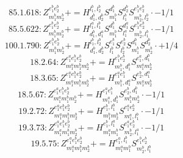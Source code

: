 \documentclass[letterpaper,10pt,fleqn,leqno,onecolumn]{article}
\begin{document}
\begin{equation} \;\;\;\;\;\;  85.1.618: Z^{e_{1}^{b}e_{2}^{b}}_{m_{1}^{b}m_{2}^{b}}+=H^{l_{1}^{b},l_{2}^{b}}_{d_{1}^{b},d_{2}^{b}}S^{d_{1}^{b}}_{m_{1}^{b}}S^{d_{2}^{b}}_{l_{1}^{b}}S^{e_{1}^{b}e_{2}^{b}}_{m_{2}^{b},l_{2}^{b}}\cdot -1/1 \end{equation}
\begin{equation} \;\;\;\;\;\;  85.5.622: Z^{e_{1}^{b}e_{2}^{b}}_{m_{1}^{b}m_{2}^{b}}+=H^{l_{1}^{a},l_{1}^{b}}_{d_{1}^{b},d_{1}^{a}}S^{d_{1}^{b}}_{m_{1}^{b}}S^{d_{1}^{a}}_{l_{1}^{a}}S^{e_{1}^{b}e_{2}^{b}}_{m_{2}^{b},l_{1}^{b}}\cdot -1/1 \end{equation}
\begin{equation} \;\;\;\;\;\;  100.1.790: Z^{e_{1}^{b}e_{2}^{b}}_{m_{1}^{b}m_{2}^{b}}+=H^{l_{1}^{b},l_{2}^{b}}_{d_{1}^{b},d_{2}^{b}}S^{e_{1}^{b}}_{l_{1}^{b}}S^{e_{2}^{b}}_{l_{2}^{b}}S^{d_{1}^{b}}_{m_{1}^{b}}S^{d_{2}^{b}}_{m_{2}^{b}}\cdot +1/4 \end{equation}
\begin{equation} \;\;\;\;\;\;  18.2.64: Z^{e_{1}^{a}e_{1}^{b}e_{2}^{b}}_{m_{1}^{a}m_{1}^{b}m_{2}^{b}}+=H^{e_{1}^{b}e_{2}^{b}}_{m_{1}^{b},d_{1}^{b}}S^{e_{1}^{a},d_{1}^{b}}_{m_{1}^{a}m_{2}^{b}} \end{equation}
\begin{equation} \;\;\;\;\;\;  18.3.65: Z^{e_{1}^{a}e_{1}^{b}e_{2}^{b}}_{m_{1}^{a}m_{1}^{b}m_{2}^{b}}+=H^{e_{1}^{a}e_{1}^{b}}_{m_{1}^{b},d_{1}^{a}}S^{e_{2}^{b},d_{1}^{a}}_{m_{1}^{a}m_{2}^{b}} \end{equation}
\begin{equation} \;\;\;\;\;\;  18.5.67: Z^{e_{1}^{a}e_{1}^{b}e_{2}^{b}}_{m_{1}^{a}m_{1}^{b}m_{2}^{b}}+=H^{e_{1}^{a}e_{1}^{b}}_{m_{1}^{a},d_{1}^{b}}S^{e_{2}^{b},d_{1}^{b}}_{m_{1}^{b}m_{2}^{b}}\cdot -1/1 \end{equation}
\begin{equation} \;\;\;\;\;\;  19.2.72: Z^{e_{1}^{a}e_{1}^{b}e_{2}^{b}}_{m_{1}^{a}m_{1}^{b}m_{2}^{b}}+=H^{e_{1}^{b},l_{1}^{b}}_{m_{1}^{b}m_{2}^{b}}S^{e_{1}^{a}e_{2}^{b}}_{m_{1}^{a},l_{1}^{b}}\cdot -1/1 \end{equation}
\begin{equation} \;\;\;\;\;\;  19.3.73: Z^{e_{1}^{a}e_{1}^{b}e_{2}^{b}}_{m_{1}^{a}m_{1}^{b}m_{2}^{b}}+=H^{e_{1}^{b},l_{1}^{a}}_{m_{1}^{a}m_{1}^{b}}S^{e_{1}^{a}e_{2}^{b}}_{m_{2}^{b},l_{1}^{a}}\cdot -1/1 \end{equation}
\begin{equation} \;\;\;\;\;\;  19.5.75: Z^{e_{1}^{a}e_{1}^{b}e_{2}^{b}}_{m_{1}^{a}m_{1}^{b}m_{2}^{b}}+=H^{e_{1}^{a},l_{1}^{b}}_{m_{1}^{a}m_{1}^{b}}S^{e_{1}^{b}e_{2}^{b}}_{m_{2}^{b},l_{1}^{b}} \end{equation}
\end{document}

